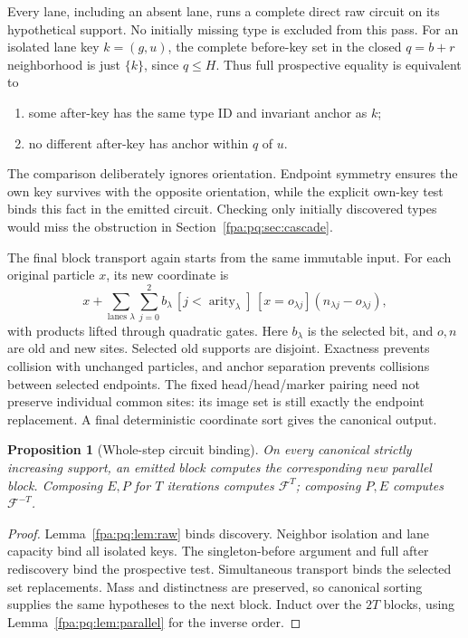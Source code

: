 \documentclass[11pt,a4paper]{article}
\numberwithin{equation}{section}
\newtheorem{proposition}[theorem]{Proposition}
\newcommand{\CA}{\mathcal F}\newcommand{\tabsize}{S_{\rm tab}}\newcommand{\Dv}{D_{\rm v}}
\begin{document}
Every lane, including an absent lane, runs a complete direct raw circuit on its hypothetical support. No initially missing type is excluded from this pass. For an isolated lane key $k=(g,u)$, the complete before-key set in the closed $q=b+r$ neighborhood is just $\{k\}$, since $q\le H$. Thus full prospective equality is equivalent to
\begin{enumerate}
\item some after-key has the same type ID and invariant anchor as $k$;
\item no different after-key has anchor within $q$ of $u$.
\end{enumerate}
The comparison deliberately ignores orientation. Endpoint symmetry ensures the own key survives with the opposite orientation, while the explicit own-key test binds this fact in the emitted circuit. Checking only initially discovered types would miss the obstruction in Section~\ref{fpa:pq:sec:cascade}.

The final block transport again starts from the same immutable input. For each original particle $x$, its new coordinate is
\[
x+\sum_{\text{lanes }\lambda}\sum_{j=0}^{2}
 b_\lambda\,[j<\operatorname{arity}_\lambda]\,[x=o_{\lambda j}]
 (n_{\lambda j}-o_{\lambda j}),
\]
with products lifted through quadratic gates. Here $b_\lambda$ is the selected bit, and $o,n$ are old and new sites. Selected old supports are disjoint. Exactness prevents collision with unchanged particles, and anchor separation prevents collisions between selected endpoints. The fixed head/head/marker pairing need not preserve individual common sites: its image set is still exactly the endpoint replacement. A final deterministic coordinate sort gives the canonical output.

\begin{proposition}[Whole-step circuit binding]\label{fpa:pq:prop:binding}
On every canonical strictly increasing support, an emitted block computes the corresponding new parallel block. Composing $E,P$ for $T$ iterations computes $\CA^T$; composing $P,E$ computes $\CA^{-T}$.
\end{proposition}
\begin{proof}
Lemma~\ref{fpa:pq:lem:raw} binds discovery. Neighbor isolation and lane capacity bind all isolated keys. The singleton-before argument and full after rediscovery bind the prospective test. Simultaneous transport binds the selected set replacements. Mass and distinctness are preserved, so canonical sorting supplies the same hypotheses to the next block. Induct over the $2T$ blocks, using Lemma~\ref{fpa:pq:lem:parallel} for the inverse order.
\end{proof}
\end{document}
